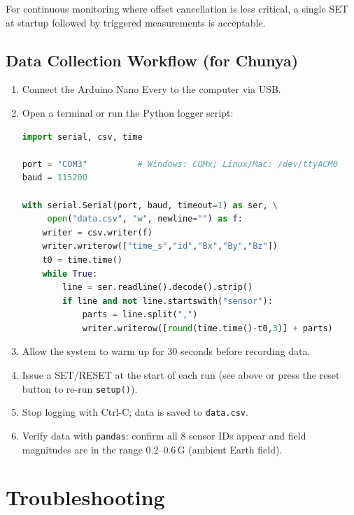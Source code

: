 \documentclass[12pt]{article}
\begin{document}
For continuous monitoring where offset cancellation is less critical,
a single SET at startup followed by triggered measurements is acceptable.

\subsection{Data Collection Workflow (for Chunya)}
\label{sec:dataworkflow}

\begin{enumerate}
  \item Connect the Arduino Nano Every to the computer via USB.
  \item Open a terminal or run the Python logger script:
\begin{lstlisting}[language=Python, caption={Minimal Python logger}]
import serial, csv, time

port = "COM3"          # Windows: COMx; Linux/Mac: /dev/ttyACM0
baud = 115200

with serial.Serial(port, baud, timeout=1) as ser, \
     open("data.csv", "w", newline="") as f:
    writer = csv.writer(f)
    writer.writerow(["time_s","id","Bx","By","Bz"])
    t0 = time.time()
    while True:
        line = ser.readline().decode().strip()
        if line and not line.startswith("sensor"):
            parts = line.split(",")
            writer.writerow([round(time.time()-t0,3)] + parts)
\end{lstlisting}
  \item Allow the system to warm up for 30 seconds before recording data.
  \item Issue a SET/RESET at the start of each run (see above or
        press the reset button to re-run \texttt{setup()}).
  \item Stop logging with Ctrl-C; data is saved to \texttt{data.csv}.
  \item Verify data with \texttt{pandas}: confirm all 8 sensor IDs
        appear and field magnitudes are in the range 0.2--0.6\,G
        (ambient Earth field).
\end{enumerate}

\newpage
\section{Troubleshooting}
\end{document}
